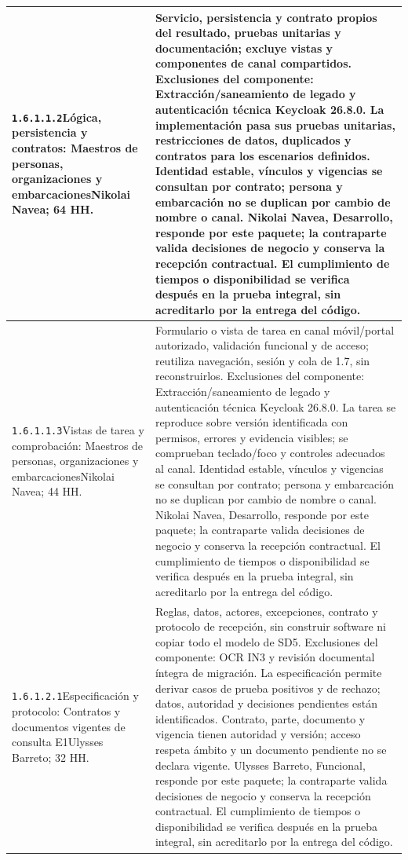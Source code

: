 \begin{longtable}{L{52mm}L{91mm}}
\texttt{1.\allowbreak{}6.\allowbreak{}1.\allowbreak{}1.\allowbreak{}2}\newline Lógica, persistencia y contratos: Maestros de personas, organizaciones y embarcaciones\newline Nikolai Navea; 64 HH. & Servicio, persistencia y contrato propios del resultado, pruebas unitarias y documentación; excluye vistas y componentes de canal compartidos. Exclusiones del componente: Extracción/saneamiento de legado y autenticación técnica Keycloak 26.8.0. La implementación pasa sus pruebas unitarias, restricciones de datos, duplicados y contratos para los escenarios definidos. Identidad estable, vínculos y vigencias se consultan por contrato; persona y embarcación no se duplican por cambio de nombre o canal. Nikolai Navea, Desarrollo, responde por este paquete; la contraparte valida decisiones de negocio y conserva la recepción contractual. El cumplimiento de tiempos o disponibilidad se verifica después en la prueba integral, sin acreditarlo por la entrega del código.\\\hline
\texttt{1.\allowbreak{}6.\allowbreak{}1.\allowbreak{}1.\allowbreak{}3}\newline Vistas de tarea y comprobación: Maestros de personas, organizaciones y embarcaciones\newline Nikolai Navea; 44 HH. & Formulario o vista de tarea en canal móvil/portal autorizado, validación funcional y de acceso; reutiliza navegación, sesión y cola de 1.7, sin reconstruirlos. Exclusiones del componente: Extracción/saneamiento de legado y autenticación técnica Keycloak 26.8.0. La tarea se reproduce sobre versión identificada con permisos, errores y evidencia visibles; se comprueban teclado/foco y controles adecuados al canal. Identidad estable, vínculos y vigencias se consultan por contrato; persona y embarcación no se duplican por cambio de nombre o canal. Nikolai Navea, Desarrollo, responde por este paquete; la contraparte valida decisiones de negocio y conserva la recepción contractual. El cumplimiento de tiempos o disponibilidad se verifica después en la prueba integral, sin acreditarlo por la entrega del código.\\\hline
\texttt{1.\allowbreak{}6.\allowbreak{}1.\allowbreak{}2.\allowbreak{}1}\newline Especificación y protocolo: Contratos y documentos vigentes de consulta E1\newline Ulysses Barreto; 32 HH. & Reglas, datos, actores, excepciones, contrato y protocolo de recepción, sin construir software ni copiar todo el modelo de SD5. Exclusiones del componente: OCR IN3 y revisión documental íntegra de migración. La especificación permite derivar casos de prueba positivos y de rechazo; datos, autoridad y decisiones pendientes están identificados. Contrato, parte, documento y vigencia tienen autoridad y versión; acceso respeta ámbito y un documento pendiente no se declara vigente. Ulysses Barreto, Funcional, responde por este paquete; la contraparte valida decisiones de negocio y conserva la recepción contractual. El cumplimiento de tiempos o disponibilidad se verifica después en la prueba integral, sin acreditarlo por la entrega del código.\\\hline

\end{longtable}
